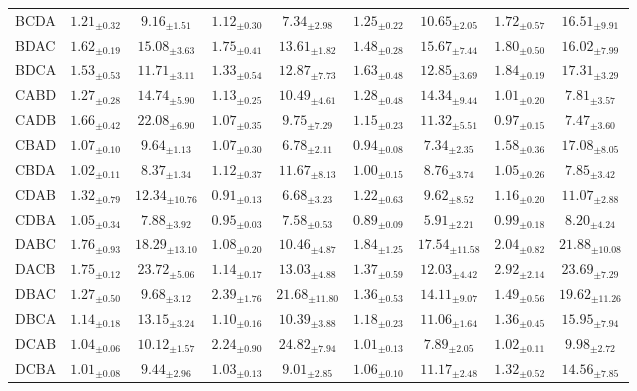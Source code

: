 \begin{table}[!t]
\begin{tabular*}{\textwidth}{@{\extracolsep{\fill}}lcccccccc}
BCDA & $1.21_{\pm0.32}$ & $9.16_{\pm1.51}$ & $1.12_{\pm0.30}$ & $7.34_{\pm2.98}$ & $1.25_{\pm0.22}$ & $10.65_{\pm2.05}$ & $1.72_{\pm0.57}$ & $16.51_{\pm9.91}$ \\
BDAC & $1.62_{\pm0.19}$ & $15.08_{\pm3.63}$ & $1.75_{\pm0.41}$ & $13.61_{\pm1.82}$ & $1.48_{\pm0.28}$ & $15.67_{\pm7.44}$ & $1.80_{\pm0.50}$ & $16.02_{\pm7.99}$ \\
BDCA & $1.53_{\pm0.53}$ & $11.71_{\pm3.11}$ & $1.33_{\pm0.54}$ & $12.87_{\pm7.73}$ & $1.63_{\pm0.48}$ & $12.85_{\pm3.69}$ & $1.84_{\pm0.19}$ & $17.31_{\pm3.29}$ \\
CABD & $1.27_{\pm0.28}$ & $14.74_{\pm5.90}$ & $1.13_{\pm0.25}$ & $10.49_{\pm4.61}$ & $1.28_{\pm0.48}$ & $14.34_{\pm9.44}$ & $1.01_{\pm0.20}$ & $7.81_{\pm3.57}$ \\
CADB & $1.66_{\pm0.42}$ & $22.08_{\pm6.90}$ & $1.07_{\pm0.35}$ & $9.75_{\pm7.29}$ & $1.15_{\pm0.23}$ & $11.32_{\pm5.51}$ & $0.97_{\pm0.15}$ & $7.47_{\pm3.60}$ \\
CBAD & $1.07_{\pm0.10}$ & $9.64_{\pm1.13}$ & $1.07_{\pm0.30}$ & $6.78_{\pm2.11}$ & $0.94_{\pm0.08}$ & $7.34_{\pm2.35}$ & $1.58_{\pm0.36}$ & $17.08_{\pm8.05}$ \\
CBDA & $1.02_{\pm0.11}$ & $8.37_{\pm1.34}$ & $1.12_{\pm0.37}$ & $11.67_{\pm8.13}$ & $1.00_{\pm0.15}$ & $8.76_{\pm3.74}$ & $1.05_{\pm0.26}$ & $7.85_{\pm3.42}$ \\
CDAB & $1.32_{\pm0.79}$ & $12.34_{\pm10.76}$ & {\boldmath$0.91_{\pm0.13}$} & $6.68_{\pm3.23}$ & $1.22_{\pm0.63}$ & $9.62_{\pm8.52}$ & $1.16_{\pm0.20}$ & $11.07_{\pm2.88}$ \\
CDBA & $1.05_{\pm0.34}$ & $7.88_{\pm3.92}$ & $0.95_{\pm0.03}$ & $7.58_{\pm0.53}$ & $0.89_{\pm0.09}$ & {\boldmath$5.91_{\pm2.21}$} & $0.99_{\pm0.18}$ & $8.20_{\pm4.24}$ \\
DABC & $1.76_{\pm0.93}$ & $18.29_{\pm13.10}$ & {\boldmath$1.08_{\pm0.20}$} & $10.46_{\pm4.87}$ & $1.84_{\pm1.25}$ & $17.54_{\pm11.58}$ & $2.04_{\pm0.82}$ & $21.88_{\pm10.08}$ \\
DACB & $1.75_{\pm0.12}$ & $23.72_{\pm5.06}$ & $1.14_{\pm0.17}$ & $13.03_{\pm4.88}$ & $1.37_{\pm0.59}$ & $12.03_{\pm4.42}$ & $2.92_{\pm2.14}$ & $23.69_{\pm7.29}$ \\
DBAC & $1.27_{\pm0.50}$ & $9.68_{\pm3.12}$ & $2.39_{\pm1.76}$ & $21.68_{\pm11.80}$ & $1.36_{\pm0.53}$ & $14.11_{\pm9.07}$ & $1.49_{\pm0.56}$ & $19.62_{\pm11.26}$ \\
DBCA & $1.14_{\pm0.18}$ & $13.15_{\pm3.24}$ & $1.10_{\pm0.16}$ & $10.39_{\pm3.88}$ & $1.18_{\pm0.23}$ & $11.06_{\pm1.64}$ & $1.36_{\pm0.45}$ & $15.95_{\pm7.94}$ \\
DCAB & $1.04_{\pm0.06}$ & $10.12_{\pm1.57}$ & $2.24_{\pm0.90}$ & $24.82_{\pm7.94}$ & $1.01_{\pm0.13}$ & $7.89_{\pm2.05}$ & $1.02_{\pm0.11}$ & $9.98_{\pm2.72}$ \\
DCBA & $1.01_{\pm0.08}$ & $9.44_{\pm2.96}$ & $1.03_{\pm0.13}$ & $9.01_{\pm2.85}$ & $1.06_{\pm0.10}$ & $11.17_{\pm2.48}$ & $1.32_{\pm0.52}$ & $14.56_{\pm7.85}$ \\
\bottomrule
\end{tabular*}
\end{table}

